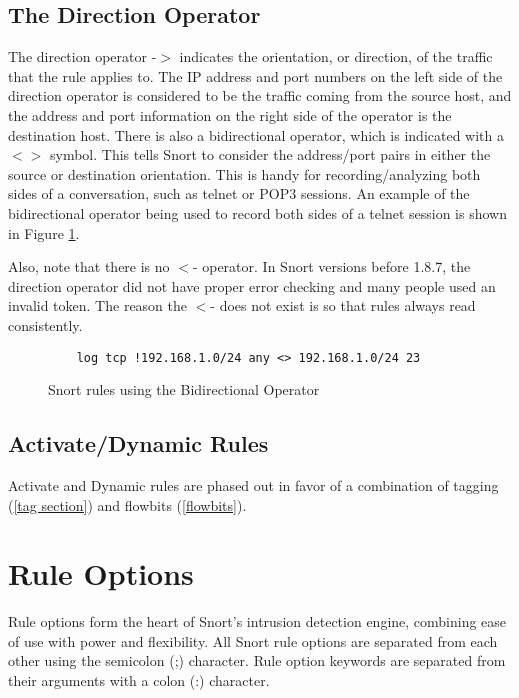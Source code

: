 \documentclass[english]{report}
\begin{document}
\subsection{The Direction Operator}

The direction operator -$>$ indicates the orientation, or direction, of the
traffic that the rule applies to. The IP address and port numbers on the left
side of the direction operator is considered to be the traffic coming from the
source host, and the address and port information on the right side of the
operator is the destination host. There is also a bidirectional operator, which
is indicated with a $<>$ symbol. This tells Snort to consider the address/port
pairs in either the source or destination orientation. This is handy for
recording/analyzing both sides of a conversation, such as telnet or POP3
sessions. An example of the bidirectional operator being used to record both
sides of a telnet session is shown in Figure \ref{bidirectional operator}.

Also, note that there is no $<$- operator. In Snort versions before 1.8.7, the
direction operator did not have proper error checking and many people used an
invalid token. The reason the $<$- does not exist is so that rules always read
consistently.

\begin{figure}
\begin{verbatim}
    log tcp !192.168.1.0/24 any <> 192.168.1.0/24 23
\end{verbatim}

\caption{\label{bidirectional operator}Snort rules using the Bidirectional
Operator}
\end{figure}

\subsection{Activate/Dynamic Rules}
\label{dynamic rules}

Activate and Dynamic rules are phased out in favor of a combination of
tagging (\ref{tag section}) and flowbits (\ref{flowbits}). 

\section{Rule Options}

Rule options form the heart of Snort's intrusion detection engine, combining
ease of use with power and flexibility. All Snort rule options are separated
from each other using the semicolon (;) character. Rule option keywords are
separated from their arguments with a colon (:) character. 
\end{document}
